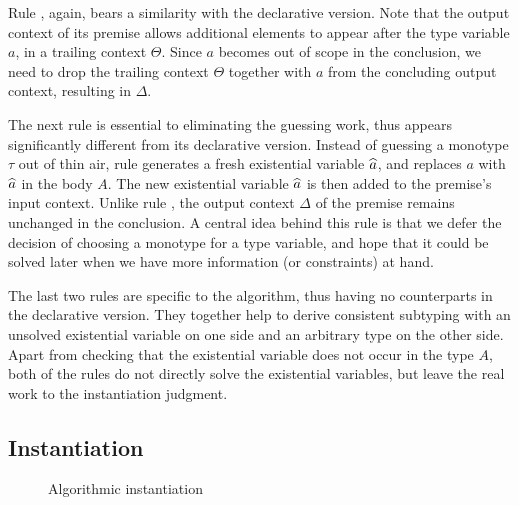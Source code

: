 Rule , again, bears a similarity with the declarative
version. Note that the output context of its premise allows additional elements
to appear after the type variable $a$, in a trailing context $\Theta$. Since $a$
becomes out of scope in the conclusion, we need to drop the trailing context
$\Theta$ together with $a$ from the concluding output context, resulting in
$\Delta$.

The next rule is essential to eliminating the guessing work, thus appears
significantly different from its declarative version. Instead of guessing a
monotype $\tau$ out of thin air, rule  generates a fresh
existential variable $\widehat{a}$, and replaces $a$ with $\widehat{a}$ in the body $A$. The
new existential variable $\widehat{a}$ is then added to the premise's input context.
Unlike rule , the output context $\Delta$ of the premise
remains unchanged in the conclusion. A central idea behind this rule is that we
defer the decision of choosing a monotype for a type variable, and hope that it
could be solved later when we have more information (or constraints) at hand.

The last two rules are specific to the algorithm, thus having no counterparts in
the declarative version. They together help to derive consistent subtyping with an
unsolved existential variable on one side and an arbitrary type on the other
side. Apart from checking that the existential variable does not occur in the
type $A$, both of the rules do not directly solve the existential variables, but
leave the real work to the instantiation judgment.

\subsection{Instantiation}
\label{sec:algo:instantiate}

\begin{figure}[t]
  \centering
  \begin{small}


  \end{small}
  \caption{Algorithmic instantiation}
  \label{fig:algo:instantiate}
\end{figure}

